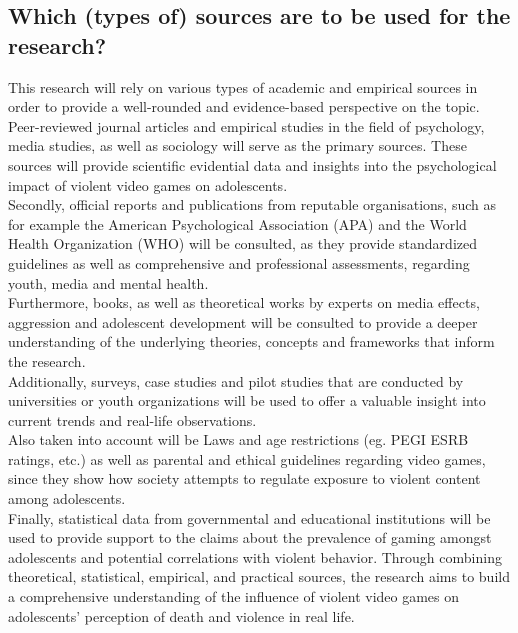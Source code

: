 \subsection{Which (types of) sources are to be used for the research?}

This research will rely on various types of academic and empirical sources in order to provide a well-rounded and evidence-based perspective on the topic.
Peer-reviewed journal articles and empirical studies in the field of psychology, media studies, as well as sociology will serve as the primary sources.
These sources will provide scientific evidential data and insights into the psychological impact of violent video games on adolescents. \\
Secondly, official reports and publications from reputable organisations, such as for example the American Psychological Association (APA)
and the World Health Organization (WHO)  will be consulted, as they provide standardized guidelines as well as comprehensive and professional assessments,
regarding youth, media and mental health. \\
Furthermore, books, as well as theoretical works by experts on media effects, aggression and adolescent development will be consulted to provide a deeper
understanding of the underlying theories, concepts and frameworks that inform the research. \\
Additionally, surveys, case studies and pilot studies that are conducted by universities or youth organizations will be used to offer a valuable insight
into current trends and real-life observations. \\
Also taken into account will be Laws and age restrictions (eg. PEGI ESRB ratings, etc.) as well as parental and ethical guidelines regarding video games, 
since they show how society attempts to regulate exposure to violent content among adolescents. \\
Finally, statistical data from governmental and educational institutions will be used to provide support to the claims about the prevalence of gaming amongst
adolescents and potential correlations with violent behavior. Through combining theoretical, statistical, empirical, and practical sources, the research aims
to build a comprehensive understanding of the influence of violent video games on adolescents' perception of death and violence in real life.
